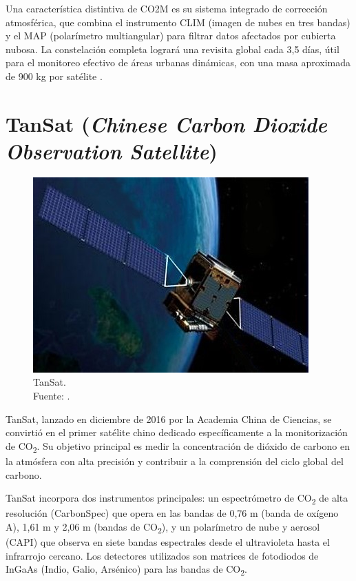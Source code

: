Una característica distintiva de CO2M es su sistema integrado de corrección atmosférica, que combina el instrumento CLIM (imagen de nubes en tres bandas) y el MAP (polarímetro multiangular) para filtrar datos afectados por cubierta nubosa. La constelación completa logrará una revisita global cada 3,5 días, útil para el monitoreo efectivo de áreas urbanas dinámicas, con una masa aproximada de 900 kg por satélite \cite{CO2M} \cite{CO2M_progress}.

\section{TanSat (\textit{Chinese Carbon Dioxide Observation Satellite})}

\begin{figure}[H]
    \centering
    \includegraphics[width=0.8\linewidth]{2.Misiones_Semejantes/tansat.jpg}
    \caption{TanSat. \\Fuente: \cite{tansat}.
}
\end{figure}

TanSat, lanzado en diciembre de 2016 por la Academia China de Ciencias, se convirtió en el primer satélite chino dedicado específicamente a la monitorización de CO\textsubscript{2}. Su objetivo principal es medir la concentración de dióxido de carbono en la atmósfera con alta precisión y contribuir a la comprensión del ciclo global del carbono.

TanSat incorpora dos instrumentos principales: un espectrómetro de CO\textsubscript{2} de alta resolución (CarbonSpec) que opera en las bandas de 0,76 \textmu m (banda de oxígeno A), 1,61 \textmu m y 2,06 \textmu m (bandas de CO\textsubscript{2}), y un polarímetro de nube y aerosol (CAPI) que observa en siete bandas espectrales desde el ultravioleta hasta el infrarrojo cercano. Los detectores utilizados son matrices de fotodiodos de InGaAs (Indio, Galio, Arsénico) para las bandas de CO\textsubscript{2}.

